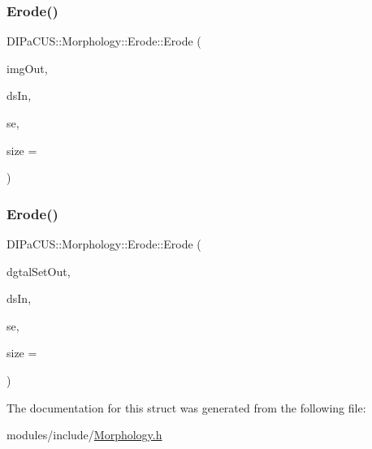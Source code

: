 \subsubsection{\texorpdfstring{Erode()}{Erode()}\hspace{0.1cm}{\footnotesize\ttfamily [1/2]}}
{\footnotesize\ttfamily D\+I\+Pa\+C\+U\+S\+::\+Morphology\+::\+Erode\+::\+Erode (\begin{DoxyParamCaption}\item[{\mbox{\hyperlink{namespaceDIPaCUS_1_1Morphology_a9aff9edf28d681accfc54435fbefcbee}{Image2D}} \&}]{img\+Out,  }\item[{const \mbox{\hyperlink{namespaceDIPaCUS_1_1Morphology_ab69fa725716b0ed4c311c0d00a292be7}{Digital\+Set}} \&}]{ds\+In,  }\item[{\mbox{\hyperlink{namespaceDIPaCUS_1_1Morphology_a60b552d68432e7992f09717070d9c4e7}{Structuring\+Element}}}]{se,  }\item[{int}]{size = {} }\end{DoxyParamCaption})\hspace{0.3cm}{\ttfamily [inline]}}

\mbox{\label{structDIPaCUS_1_1Morphology_1_1Erode_adcbd2d42bb448c5052addb2e57b9ad39}} 
\subsubsection{\texorpdfstring{Erode()}{Erode()}\hspace{0.1cm}{\footnotesize\ttfamily [2/2]}}
{\footnotesize\ttfamily D\+I\+Pa\+C\+U\+S\+::\+Morphology\+::\+Erode\+::\+Erode (\begin{DoxyParamCaption}\item[{\mbox{\hyperlink{namespaceDIPaCUS_1_1Morphology_ab69fa725716b0ed4c311c0d00a292be7}{Digital\+Set}} \&}]{dgtal\+Set\+Out,  }\item[{const \mbox{\hyperlink{namespaceDIPaCUS_1_1Morphology_ab69fa725716b0ed4c311c0d00a292be7}{Digital\+Set}} \&}]{ds\+In,  }\item[{\mbox{\hyperlink{namespaceDIPaCUS_1_1Morphology_a60b552d68432e7992f09717070d9c4e7}{Structuring\+Element}}}]{se,  }\item[{int}]{size = {} }\end{DoxyParamCaption})\hspace{0.3cm}{\ttfamily [inline]}}



The documentation for this struct was generated from the following file\+:\begin{DoxyCompactItemize}
\item 
modules/include/\mbox{\hyperlink{Morphology_8h}{Morphology.\+h}}\end{DoxyCompactItemize}
